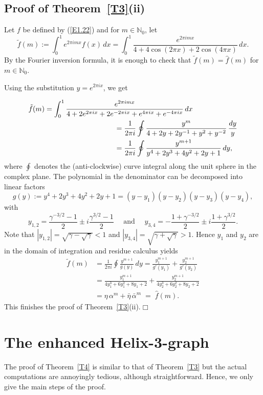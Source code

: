\documentclass[11pt]{article}
\providecommand{\1}{\mathBB{1}}
\newcommand{\mbu}{\quad\mbox{ and }\quad}
\newcommand{\N}{{\mathbb{N}}}
\def\hatf{\widehat f}
\newcommand{\equ}[1]{(\ref{#1})}
\providecommand{\eop}{{}\hfill {}\hfill{$\Box
$}\vspace{0.3cm}\pagebreak[2]\par}
\newcommand{\Section}[1]{\section{#1}\setcounter{figure}{0}\setcounter{table}{0}\setcounter{equation}{0}}
\begin{document}
\subsection{Proof of Theorem~\ref{T3}(ii)}
\label{S4.3}

Let $f$ be defined by \equ{E1.22} and for $m\in\N_0$, let
$$\tilde f(m):=
\int_0^1e^{2\pi i mx}f(x)\,dx=
\int_0^1\frac{e^{2\pi i mx}}{4+4\cos(2\pi x)+2\cos(4\pi x)}\,dx.
$$
By the Fourier inversion formula, it is enough to check that $\tilde f(m)=\hatf(m)$ for $m\in\N_0$.

Using the substitution $y=e^{2\pi i x}$, we get

$$\begin{aligned}
&\tilde f(m)=\int_0^1\frac{e^{2\pi i mx}}
{4+2e^{2\pi i x}+2e^{-2\pi i x}+e^{4\pi i x}+e^{-4\pi i x}}\,dx\\
&\hspace*{12em}=\frac{1}{2\pi i}\oint\frac{y^m}{4+2y+2y^{-1}+y^2+y^{-2}}\,\frac{dy}{y}\\
&\hspace*{12em}=\frac{1}{2\pi i}\oint\frac{y^{m+1}}{y^4+2y^3+4y^2+2y+1}\,dy,
\end{aligned}
$$
where $\oint$ denotes the (anti-clockwise) curve integral along the unit sphere in the complex plane. The polynomial in the denominator can be decomposed into linear factors
$$g(y):=y^4+2y^3+4y^2+2y+1=(y-y_1)(y-y_2)(y-y_3)(y-y_4),$$
with
$$
y_{1,2}=\frac{\gamma^{-3/2}-1}{2}\pm i\frac{\gamma^{3/2}-1}{2}\mbu
y_{3,4}=-\frac{1+\gamma^{-3/2}}{2}\pm i\frac{1+\gamma^{3/2}}{2}.
$$
Note that $|y_{1,2}|=\sqrt{\gamma-\sqrt{\gamma}}<1$ and
$|y_{3,4}|=\sqrt{\gamma+\sqrt{\gamma}}>1$. Hence $y_1$ and $y_2$ are in the domain of integration and residue calculus yields
$$\begin{aligned}
\tilde f(m)
&=\frac{1}{2\pi i}\oint\frac{y^{m+1}}{g(y)}\,dy
=\frac{y_1^{m+1}}{g'(y_1)}+\frac{y_2^{m+1}}{g'(y_2)}\\
&=\frac{y_1^{m+1}}{4y_1^3+6y_1^2+8y_1+2}+\frac{y_2^{m+1}}{4y_2^3+6y_2^2+8y_2+2}\\
&=\eta\,\alpha^m+\bar\eta\,\bar\alpha^m\;=\;\hatf(m).
\end{aligned}
$$
This finishes the proof of Theorem~\ref{T3}(ii).\eop
\Section{The enhanced Helix-3-graph}
\label{S5}
The proof of Theorem~\ref{T4} is similar to that of Theorem~\ref{T3} but the actual computations are annoyingly tedious, although straightforward. Hence, we only give the main steps of the proof.
\end{document}
